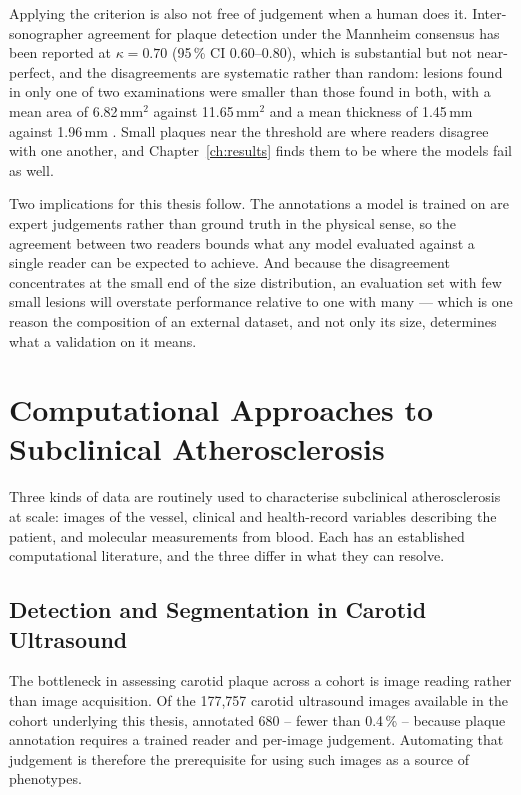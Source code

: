 Applying the criterion is also not free of judgement when a human does it. Inter-sonographer
agreement for plaque detection under the Mannheim consensus has been reported at
$\kappa = 0.70$ (95\,\% CI 0.60--0.80), which is substantial but not near-perfect, and the
disagreements are systematic rather than random: lesions found in only one of two examinations
were smaller than those found in both, with a mean area of 6.82\,mm$^2$ against 11.65\,mm$^2$ and
a mean thickness of 1.45\,mm against 1.96\,mm \cite{nyman2020reproducibility}. Small plaques near
the threshold are where readers disagree with one another, and Chapter~\ref{ch:results} finds
them to be where the models fail as well.

Two implications for this thesis follow. The annotations a model is trained on are expert
judgements rather than ground truth in the physical sense, so the agreement between two readers
bounds what any model evaluated against a single reader can be expected to achieve. And because
the disagreement concentrates at the small end of the size distribution, an evaluation set with
few small lesions will overstate performance relative to one with many --- which is one reason the
composition of an external dataset, and not only its size, determines what a validation on it
means.
\section{Computational Approaches to Subclinical Atherosclerosis}
\label{sec:automated-detection}

Three kinds of data are routinely used to characterise subclinical atherosclerosis at scale:
images of the vessel, clinical and health-record variables describing the patient, and molecular
measurements from blood. Each has an established computational literature, and the three differ
in what they can resolve.

\subsection{Detection and Segmentation in Carotid Ultrasound}

The bottleneck in assessing carotid plaque across a cohort is image reading rather than image
acquisition. Of the 177{,}757 carotid ultrasound images available in the cohort underlying this
thesis, \textcite{omarov2024deep} annotated 680 -- fewer than 0.4\,\% -- because plaque annotation
requires a trained reader and per-image judgement. Automating that judgement is therefore the
prerequisite for using such images as a source of phenotypes.

